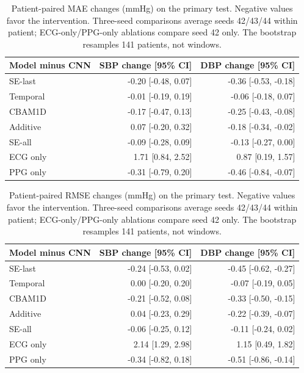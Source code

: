 \documentclass[11pt]{article}
\begin{document}
\begin{table}[!htbp]\centering\small
\begin{tabular}{lrr}\toprule
Model minus CNN & SBP change [95\% CI] & DBP change [95\% CI]\\\midrule
SE-last & -0.20 [-0.48, 0.07] & -0.36 [-0.53, -0.18]\\
Temporal & -0.01 [-0.19, 0.19] & -0.06 [-0.18, 0.07]\\
CBAM1D & -0.17 [-0.47, 0.13] & -0.25 [-0.43, -0.08]\\
Additive & 0.07 [-0.20, 0.32] & -0.18 [-0.34, -0.02]\\
SE-all & -0.09 [-0.28, 0.09] & -0.13 [-0.27, 0.00]\\
ECG only & 1.71 [0.84, 2.52] & 0.87 [0.19, 1.57]\\
PPG only & -0.31 [-0.79, 0.20] & -0.46 [-0.84, -0.07]\\
\bottomrule\end{tabular}
\caption{Patient-paired MAE changes (mmHg) on the primary test. Negative values favor the intervention. Three-seed comparisons average seeds 42/43/44 within patient; ECG-only/PPG-only ablations compare seed 42 only. The bootstrap resamples 141 patients, not windows.}\end{table}

\begin{table}[!htbp]\centering\small
\begin{tabular}{lrr}\toprule
Model minus CNN & SBP change [95\% CI] & DBP change [95\% CI]\\\midrule
SE-last & -0.24 [-0.53, 0.02] & -0.45 [-0.62, -0.27]\\
Temporal & 0.00 [-0.20, 0.20] & -0.07 [-0.19, 0.05]\\
CBAM1D & -0.21 [-0.52, 0.08] & -0.33 [-0.50, -0.15]\\
Additive & 0.04 [-0.23, 0.29] & -0.22 [-0.39, -0.07]\\
SE-all & -0.06 [-0.25, 0.12] & -0.11 [-0.24, 0.02]\\
ECG only & 2.14 [1.29, 2.98] & 1.15 [0.49, 1.82]\\
PPG only & -0.34 [-0.82, 0.18] & -0.51 [-0.86, -0.14]\\
\bottomrule\end{tabular}
\caption{Patient-paired RMSE changes (mmHg) on the primary test. Negative values favor the intervention. Three-seed comparisons average seeds 42/43/44 within patient; ECG-only/PPG-only ablations compare seed 42 only. The bootstrap resamples 141 patients, not windows.}\end{table}
\end{document}
